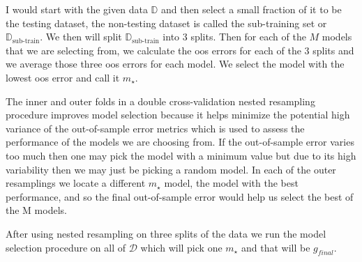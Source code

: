 \documentclass[12pt]{article}
\begin{document}
\begin{enumerate}
\begin{tcolorbox}[colback=white, sharp corners]
I would start with the given data $\mathbb{D}$ and then select a small fraction of it to be the testing dataset, the non-testing dataset is called the sub-training set or $\mathbb{D}_{\text{sub-train}}$. We then will split $\mathbb{D}_{\text{sub-train}}$ into 3 splits. Then for each of the $M$ models that we are selecting from, we calculate the oos errors for each of the 3 splits and we average those three oos errors for each model. We select the model with the lowest oos error and call it $m_{\star}$.
\end{tcolorbox}


\begin{tcolorbox}[colback=white, sharp corners]
The inner and outer folds in a double cross-validation nested resampling procedure improves model selection because it helps minimize the potential high variance of the out-of-sample error metrics which is used to assess the performance of the models we are choosing from. If the out-of-sample error varies too much then one may pick the model with a minimum value but due to its high variability then we may just be picking a random model. In each of the outer resamplings we locate a different $m_{\star}$ model, the model with the best performance, and so the final out-of-sample error would help us select the best of the M models. 
\end{tcolorbox}


\begin{tcolorbox}[colback=white, sharp corners]
After using nested resampling on three splits of the data we run the model selection procedure on all of $\mathcal{D}$ which will pick one $m_{\star}$ and that will be $g_{final}$.
\end{tcolorbox}



\end{enumerate}
\end{document}
